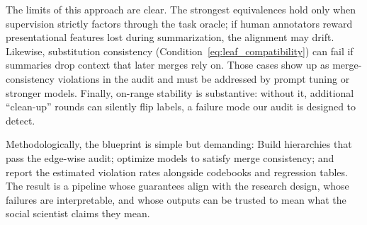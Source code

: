 The limits of this approach are clear. The strongest equivalences hold only when supervision strictly factors through the task oracle; if human annotators reward presentational features lost during summarization, the alignment may drift. Likewise, substitution consistency (Condition~\eqref{eq:leaf_compatibility}) can fail if summaries drop context that later merges rely on. Those cases show up as merge-consistency violations in the audit and must be addressed by prompt tuning or stronger models. Finally, on-range stability is substantive: without it, additional ``clean-up'' rounds can silently flip labels, a failure mode our audit is designed to detect.

Methodologically, the blueprint is simple but demanding: Build hierarchies that pass the edge-wise audit; optimize models to satisfy merge consistency; and report the estimated violation rates alongside codebooks and regression tables. The result is a pipeline whose guarantees align with the research design, whose failures are interpretable, and whose outputs can be trusted to mean what the social scientist claims they mean.



